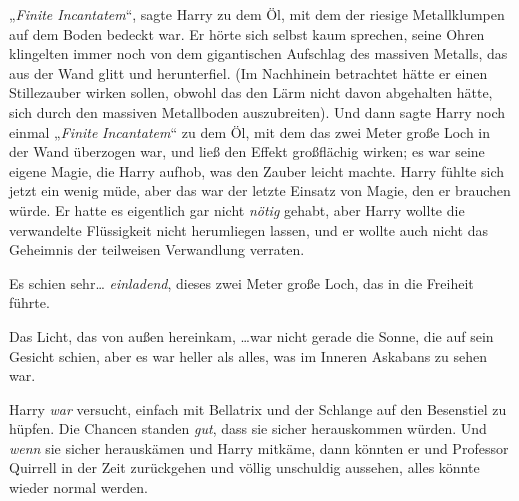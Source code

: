 „\emph{Finite Incantatem}“, sagte Harry zu dem Öl, mit dem der riesige Metallklumpen auf dem Boden bedeckt war. Er hörte sich selbst kaum sprechen, seine Ohren klingelten immer noch von dem gigantischen Aufschlag des massiven Metalls, das aus der Wand glitt und herunterfiel. (Im Nachhinein betrachtet hätte er einen Stillezauber wirken sollen, obwohl das den Lärm nicht davon abgehalten hätte, sich durch den massiven Metallboden auszubreiten). Und dann sagte Harry noch einmal „\emph{Finite} \emph{Incantatem}“ zu dem Öl, mit dem das zwei Meter große Loch in der Wand überzogen war, und ließ den Effekt großflächig wirken; es war seine eigene Magie, die Harry aufhob, was den Zauber leicht machte. Harry fühlte sich jetzt ein wenig müde, aber das war der letzte Einsatz von Magie, den er brauchen würde. Er hatte es eigentlich gar nicht \emph{nötig} gehabt, aber Harry wollte die verwandelte Flüssigkeit nicht herumliegen lassen, und er wollte auch nicht das Geheimnis der teilweisen Verwandlung verraten.

Es schien sehr… \emph{einladend}, dieses zwei Meter große Loch, das in die Freiheit führte.

Das Licht, das von außen hereinkam, …war nicht gerade die Sonne, die auf sein Gesicht schien, aber es war heller als alles, was im Inneren Askabans zu sehen war.

Harry \emph{war} versucht, einfach mit Bellatrix und der Schlange auf den Besenstiel zu hüpfen. Die Chancen standen \emph{gut}, dass sie sicher herauskommen würden. Und \emph{wenn} sie sicher herauskämen und Harry mitkäme, dann könnten er und Professor Quirrell in der Zeit zurückgehen und völlig unschuldig aussehen, alles könnte wieder normal werden.

